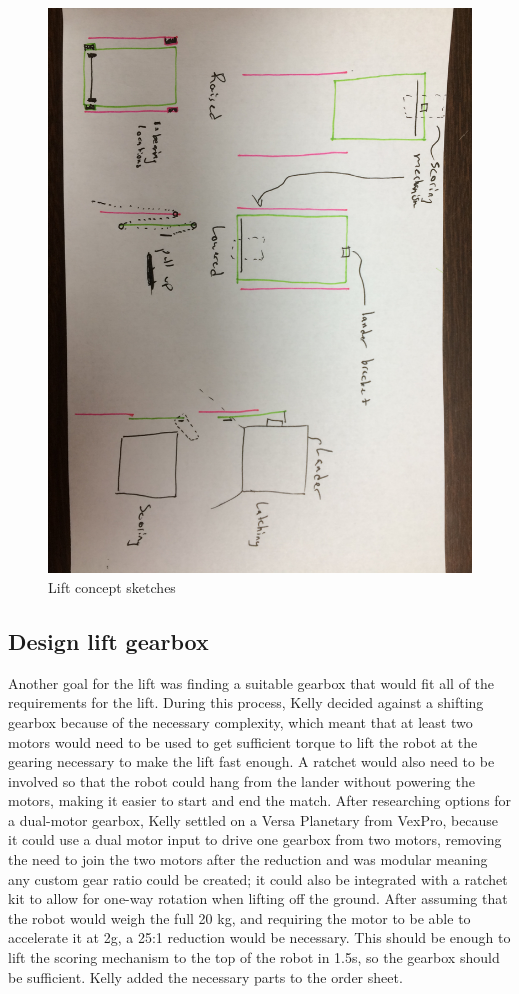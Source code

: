 \documentclass{article}
\begin{document}
\begin{figure}
    \centering
    \includegraphics[width=.75\textwidth]{04_09-24/images/lift.jpg}
    \caption{Lift concept sketches}
    \label{fig:lift}
\end{figure}

\subsection{Design lift gearbox}
Another goal for the lift was finding a suitable gearbox that would fit all of the requirements for the lift. During this process, Kelly decided against a shifting gearbox because of the necessary complexity, which meant that at least two motors would need to be used to get sufficient torque to lift the robot at the gearing necessary to make the lift fast enough. A ratchet would also need to be involved so that the robot could hang from the lander without powering the motors, making it easier to start and end the match. After researching options for a dual-motor gearbox, Kelly settled on a Versa Planetary from VexPro, because it could use a dual motor input to drive one gearbox from two motors, removing the need to join the two motors after the reduction and was modular meaning any custom gear ratio could be created; it could also be integrated with a ratchet kit to allow for one-way rotation when lifting off the ground. After assuming that the robot would weigh the full 20 kg, and requiring the motor to be able to accelerate it at 2g, a 25:1 reduction would be necessary. This should be enough to lift the scoring mechanism to the top of the robot in 1.5s, so the gearbox should be sufficient. Kelly added the necessary parts to the order sheet.
\end{document}
